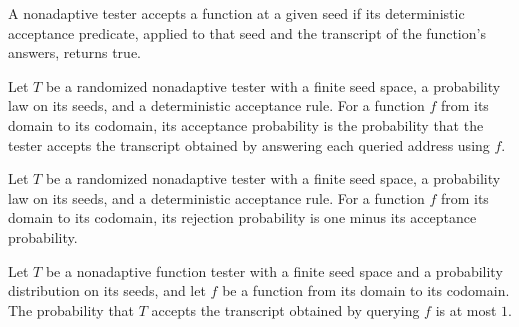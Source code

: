 \begin{definition}
\label{FABL.NonadaptiveFunctionTester.accepts}
\leanok
{}
A nonadaptive tester accepts a function at a given seed if its deterministic acceptance
predicate, applied to that seed and the transcript of the function's answers, returns
true.
\end{definition}

\begin{definition}
\label{FABL.NonadaptiveFunctionTester.acceptanceProbability}
\leanok
{}
Let $T$ be a randomized nonadaptive tester with a finite seed space, a probability law
on its seeds, and a deterministic acceptance rule. For a function $f$ from its domain to
its codomain, its acceptance probability is the probability that the tester accepts the
transcript obtained by answering each queried address using $f$.
\end{definition}

\begin{definition}
\label{FABL.NonadaptiveFunctionTester.rejectionProbability}
\leanok
{}
Let $T$ be a randomized nonadaptive tester with a finite seed space, a probability law
on its seeds, and a deterministic acceptance rule. For a function $f$ from its domain to
its codomain, its rejection probability is one minus its acceptance probability.
\end{definition}

\begin{theorem}
\label{FABL.NonadaptiveFunctionTester.acceptanceProbability_le_one}
\leanok
{}
Let $T$ be a nonadaptive function tester with a finite seed space and a probability
distribution on its seeds, and let $f$ be a function from its domain to its codomain.
The probability that $T$ accepts the transcript obtained by querying $f$ is at most $1$.
\end{theorem}

